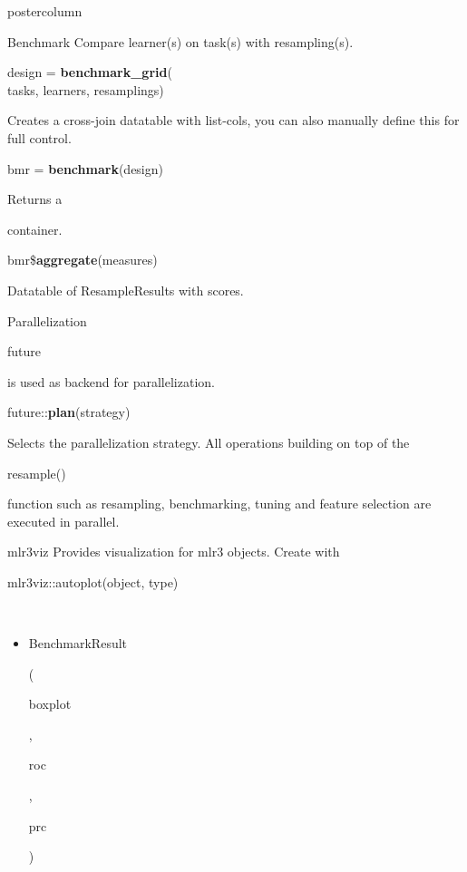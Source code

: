 \documentclass{beamer}
\newlength{\columnheight} %
\newcommand{\codeinline}[1]{\begin{codeboxinline}#1\end{codeboxinline}}
\begin{document}
\begin{withoutheader}
\begin{frame}[fragile]{}
\begin{columns}
		\begin{column}{.245\textwidth}
			\begin{beamercolorbox}[center]{postercolumn}
				\begin{minipage}{.98\textwidth}
					\parbox[t][\columnheight]{\textwidth}{
						\begin{myblock}{Benchmark}
                            Compare learner(s) on task(s) with resampling(s).
						\\
						\begin{codeboxmultiline}[width=19.4cm]
							design = \textbf{benchmark\_grid}(\\
							\hspace*{1ex}tasks, learners, resamplings)
						\end{codeboxmultiline}
						Creates a cross-join datatable with list-cols, you can also manually define this for full control.
						\\
						\begin{codebox}
							bmr = \textbf{benchmark}(design)
						\end{codebox}
						Returns a \codeinline{}
						container.
						\\
						\begin{codebox}
							bmr\$\textbf{aggregate}(measures)
						\end{codebox}
						Datatable of ResampleResults with scores.
					\end{myblock}
					\begin{myblock}{Parallelization}
						\codeinline{future} is used as backend for parallelization.
						\\
						\begin{codebox}
							future::\textbf{plan}(strategy)
						\end{codebox}
						Selects the parallelization strategy. All operations building on top of the \codeinline{resample()} function such as resampling, benchmarking, tuning and feature selection are executed in parallel.
					\end{myblock}
					\begin{myblock}{mlr3viz}
						Provides visualization for mlr3 objects.
						Create with \codeinline{mlr3viz::autoplot(object, type)}
						\\
						\begin{itemize}
							\item \codeinline{BenchmarkResult} (\codeinline{boxplot}, \codeinline{roc}, \codeinline{prc})

\end{itemize}
\end{myblock}}
\end{minipage}
\end{beamercolorbox}
\end{column}
\end{columns}
\end{frame}
\end{withoutheader}
\end{document}
